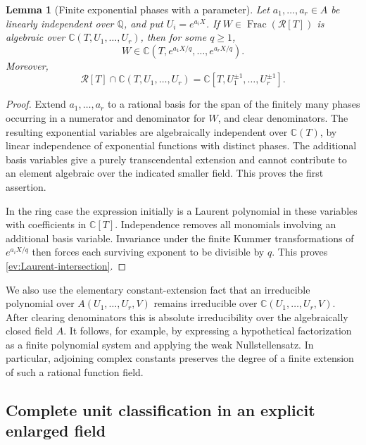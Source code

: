 \documentclass[11pt,a4paper]{article}
\numberwithin{equation}{section}
\newtheorem{lemma}[theorem]{Lemma}
\theoremstyle{definition}
\theoremstyle{remark}
\begin{document}
\begin{lemma}[Finite exponential phases with a parameter]
\label{ev:finite-phases}
Let $a_1,\ldots,a_r\in A$ be linearly independent over $\mathbb Q$,
and put $U_i=e^{a_iX}$.  If $W\in\operatorname{Frac}(\mathcal R[T])$
is algebraic over $\mathbb C(T,U_1,\ldots,U_r)$, then for some $q\ge1$,
\[
 W\in\mathbb C(T,e^{a_1X/q},\ldots,e^{a_rX/q}).
\]
Moreover,
\begin{equation}\label{ev:Laurent-intersection}
 \mathcal R[T]\cap\mathbb C(T,U_1,\ldots,U_r)
   =\mathbb C[T,U_1^{\pm1},\ldots,U_r^{\pm1}].
\end{equation}
\end{lemma}
\begin{proof}
Extend $a_1,\ldots,a_r$ to a rational basis for the span of the finitely
many phases occurring in a numerator and denominator for $W$, and
clear denominators.  The resulting exponential variables are
algebraically independent over $\mathbb C(T)$, by linear independence
of exponential functions with distinct phases.  The additional basis
variables give a purely transcendental extension and cannot contribute
to an element algebraic over the indicated smaller field.  This proves
the first assertion.

In the ring case the expression initially is a Laurent polynomial in
these variables with coefficients in $\mathbb C[T]$.  Independence
removes all monomials involving an additional basis variable.  Invariance
under the finite Kummer transformations of $e^{a_iX/q}$ then forces
each surviving exponent to be divisible by $q$.  This proves
\eqref{ev:Laurent-intersection}.
\end{proof}

We also use the elementary constant-extension fact that an irreducible
polynomial over $A(U_1,\ldots,U_r,V)$ remains irreducible over
$\mathbb C(U_1,\ldots,U_r,V)$.  After clearing denominators this is
absolute irreducibility over the algebraically closed field $A$.
It follows, for example, by expressing a hypothetical factorization
as a finite polynomial system and applying the weak Nullstellensatz.
In particular, adjoining complex constants preserves the degree of a
finite extension of such a rational function field.

\subsection{Complete unit classification in an explicit enlarged field}
\end{document}

